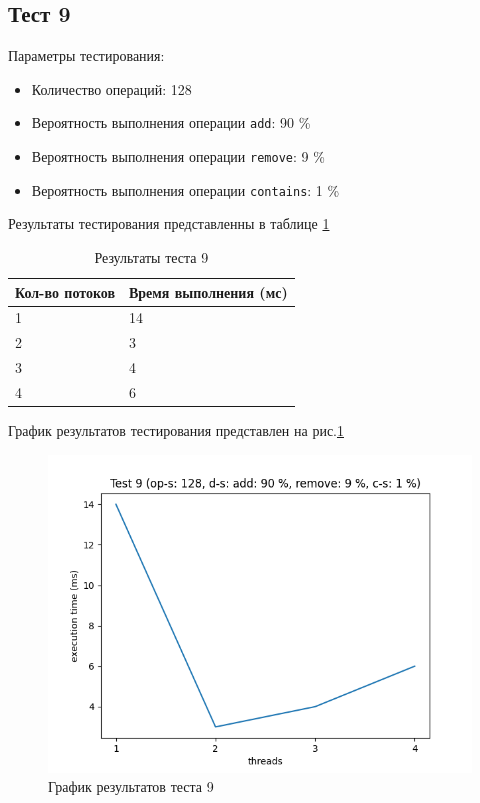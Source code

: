 \subsection*{Тест 9}

Параметры тестирования:

\begin{itemize}
    \item Количество операций: 128
    \item Вероятность выполнения операции \verb|add|: 90 \%
    \item Вероятность выполнения операции \verb|remove|: 9 \%
    \item Вероятность выполнения операции \verb|contains|: 1 \%
\end{itemize}

Результаты тестирования представленны в таблице \ref{tab:results9}


\begin{table}[H]
    \centering
    \begin{tabular}{|l|l|}
        \hline
        Кол-во потоков & Время выполнения (мс) \\
        \hline
        1 & 14 \\
        \hline
        2 & 3 \\
        \hline
        3 & 4 \\
        \hline
        4 & 6 \\
        \hline
    \end{tabular}
    \caption{Результаты теста 9}
    \label{tab:results9}
\end{table}
        

График результатов тестирования представлен на рис.\ref{fig:plot9}

\begin{figure}[H]
    \centering
    \includegraphics[width=0.7\linewidth]{photo/plot9}
    \caption{График результатов теста 9}
    \label{fig:plot9}
\end{figure}

